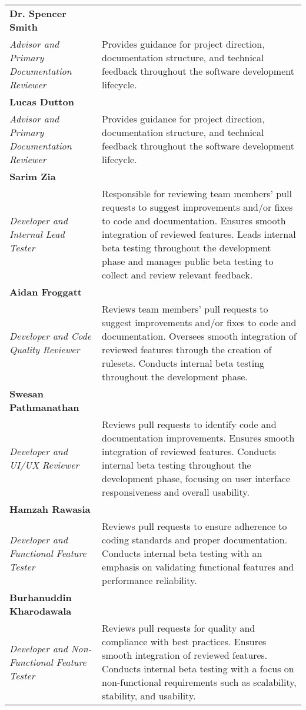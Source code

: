 \documentclass[12pt, titlepage]{article}
\begin{document}
\begin{tabular}{p{4cm} p{11cm}}

\textbf{Dr. Spencer Smith} \\ 
\textit{Advisor and Primary Documentation Reviewer} 
& Provides guidance for project direction, documentation structure, and technical feedback throughout the software development lifecycle. \\[1em]

\textbf{Lucas Dutton} \\ 
\textit{Advisor and Primary Documentation Reviewer} 
& Provides guidance for project direction, documentation structure, and technical feedback throughout the software development lifecycle. \\[1em]

\textbf{Sarim Zia} \\ 
\textit{Developer and Internal Lead Tester} 
& Responsible for reviewing team members’ pull requests to suggest improvements and/or fixes to code and documentation. 
Ensures smooth integration of reviewed features. Leads internal beta testing throughout the development phase and manages public beta testing to collect and review relevant feedback. \\[1em]

\textbf{Aidan Froggatt} \\ 
\textit{Developer and Code Quality Reviewer} 
& Reviews team members’ pull requests to suggest improvements and/or fixes to code and documentation. 
Oversees smooth integration of reviewed features through the creation of rulesets. 
Conducts internal beta testing throughout the development phase. \\[1em]

\textbf{Swesan Pathmanathan} \\ 
\textit{Developer and UI/UX Reviewer} 
& Reviews pull requests to identify code and documentation improvements. 
Ensures smooth integration of reviewed features. 
Conducts internal beta testing throughout the development phase, focusing on user interface responsiveness and overall usability. \\[1em]

\textbf{Hamzah Rawasia} \\ 
\textit{Developer and Functional Feature Tester} 
& Reviews pull requests to ensure adherence to coding standards and proper documentation. 
Conducts internal beta testing with an emphasis on validating functional features and performance reliability. \\[1em]

\textbf{Burhanuddin Kharodawala} \\ 
\textit{Developer and Non-Functional Feature Tester} 
& Reviews pull requests for quality and compliance with best practices. 
Ensures smooth integration of reviewed features. 
Conducts internal beta testing with a focus on non-functional requirements such as scalability, stability, and usability. \\

\end{tabular}
\end{document}
